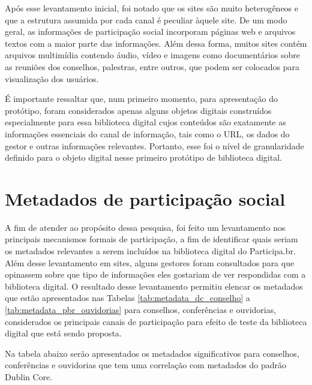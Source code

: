 Após esse levantamento inicial, foi notado que os sites são muito heterogêneos e que a estrutura assumida por cada canal é peculiar àquele site. De um modo geral, as informações de participação social incorporam páginas web e arquivos textos com a maior parte das informações. Além dessa forma, muitos sites contém arquivos multimídia contendo áudio, vídeo e imagens como documentários sobre as reuniões dos conselhos, palestras, entre outros, que podem ser colocados para visualização dos usuários.

É importante ressaltar que, num primeiro momento, para apresentação do protótipo, foram considerados apenas alguns objetos digitais construídos especialmente para essa biblioteca digital cujos conteúdos são exatamente as informações essenciais do canal de informação, tais como o URL, os dados do gestor e outras informações relevantes. Portanto, esse foi o nível de granularidade definido para o objeto digital nesse primeiro protótipo de biblioteca digital.


\section{Metadados de participação social}
\label{sub:metadadospbr}

A fim de atender ao propósito dessa pesquisa, foi feito um levantamento nos principais mecanismos formais de participação, a fim de identificar quais seriam os metadados relevantes a serem incluídos na biblioteca digital do Participa.br. Além desse levantamento em sites, alguns gestores foram consultados para que opinassem sobre que tipo de informações eles gostariam de ver respondidas com a biblioteca digital. O resultado desse levantamento permitiu elencar os metadados que estão apresentados nas Tabelas \ref{tab:metadata_dc_conselho} a \ref{tab:metadata_pbr_ouvidorias} para conselhos, conferências e ouvidorias, considerados os principais canais de participação para efeito de teste da biblioteca digital que está sendo proposta.

Na tabela abaixo serão apresentados os metadados significativos para conselhos, conferências e ouvidorias que tem uma correlação com metadados do padrão Dublin Core.

